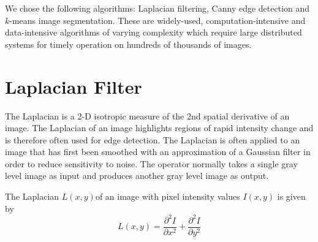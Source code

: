 \documentclass{osuthesis}
\begin{document}
					We chose the following algorithms: Laplacian filtering, Canny edge
					detection and $k$-means image segmentation.  These are widely-used,
					computation-intensive and data-intensive algorithms of varying complexity which
					require large distributed systems for timely operation on hundreds of
					thousands of images.
					
					
					
					\section{Laplacian Filter}
					The Laplacian is a 2-D isotropic measure of the 2nd spatial derivative
					of an image. The Laplacian of an image highlights regions of rapid
					intensity change and is therefore often used for edge detection. The
					Laplacian is often applied to an image that has first been smoothed
					with an approximation of a Gaussian filter in order to reduce
					sensitivity to noise. The operator normally takes a single gray level
					image as input and produces another gray level image as output.
					
					The Laplacian \begin{math} L(x,y)\end{math}of an image with pixel
					intensity values \begin{math}I(x,y)\end{math} is given by
					\begin{equation}
					L(x,y) = \frac{\partial^2 I}{\partial x^2} + \frac{\partial^2 I}{\partial y^2}
					\end{equation} 
					
\end{document}
